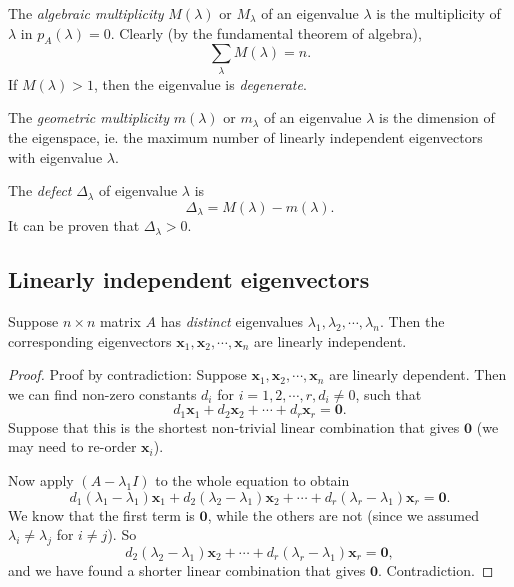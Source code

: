 \documentclass[a4paper]{article}
\begin{document}
    \begin{defi}
      The \emph{algebraic multiplicity} $M(\lambda)$ or $M_\lambda$ of an eigenvalue $\lambda$ is the multiplicity of $\lambda$ in $p_A(\lambda) = 0$. Clearly (by the fundamental theorem of algebra),
      \[
        \sum_\lambda M(\lambda) = n.
      \]
      If $M(\lambda) > 1$, then the eigenvalue is \emph{degenerate}.
    \end{defi}

    \begin{defi}
      The \emph{geometric multiplicity} $m(\lambda)$ or $m_\lambda$ of an eigenvalue $\lambda$ is the dimension of the eigenspace, ie. the maximum number of linearly independent eigenvectors with eigenvalue $\lambda$.
    \end{defi}

    \begin{defi}
      The \emph{defect} $\Delta_\lambda$ of eigenvalue $\lambda$ is
      \[
        \Delta_\lambda = M(\lambda) - m(\lambda).
      \]
      It can be proven that $\Delta_\lambda > 0$.
    \end{defi}

    \subsection{Linearly independent eigenvectors}
    \begin{thm}
      Suppose $n\times n$ matrix $A$ has \emph{distinct} eigenvalues $\lambda_1, \lambda_2, \cdots, \lambda_n$. Then the corresponding eigenvectors $\mathbf{x}_1, \mathbf{x}_2, \cdots, \mathbf{x}_n$ are linearly independent.
    \end{thm}

    \begin{proof}
      Proof by contradiction: Suppose $\mathbf{x}_1, \mathbf{x}_2, \cdots, \mathbf{x}_n$ are linearly dependent. Then we can find non-zero constants $d_i$ for $i = 1, 2, \cdots, r, d_i\not= 0$, such that
      \[
        d_1\mathbf{x}_1 + d_2\mathbf{x}_2 + \cdots + d_r\mathbf{x}_r = \mathbf{0}.
      \]
      Suppose that this is the shortest non-trivial linear combination that gives $\mathbf{0}$ (we may need to re-order $\mathbf{x}_i$).

      Now apply $(A - \lambda_1 I)$ to the whole equation to obtain
      \[
        d_1(\lambda_1 - \lambda_1)\mathbf{x}_1 + d_2(\lambda_2 - \lambda_1)\mathbf{x}_2 + \cdots + d_r(\lambda_r - \lambda_1)\mathbf{x}_r = \mathbf{0}.
      \]
      We know that the first term is $\mathbf{0}$, while the others are not (since we assumed $\lambda_i \not= \lambda_j$ for $i\not= j$). So
      \[
        d_2(\lambda_2 - \lambda_1)\mathbf{x}_2 + \cdots + d_r(\lambda_r - \lambda_1)\mathbf{x}_r = \mathbf{0},
      \]
      and we have found a shorter linear combination that gives $\mathbf{0}$. Contradiction.
    \end{proof}
\end{document}
